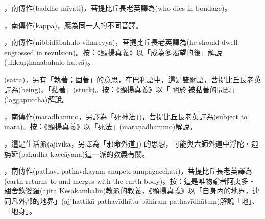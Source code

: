 \startitemgroup[noteitems]
\item{}，南傳作(baddho mīyati)，菩提比丘長老英譯為(who dies in bondage)。
\stopitemgroup

\startitemgroup[noteitems]
\item{}，南傳作(kappa)，應為同一人的不同音譯。
\stopitemgroup

\startitemgroup[noteitems]
\item{}，南傳作(nibbidābahulo vihareyya)，菩提比丘長老英譯為(he should dwell engrossed in revulsion)。按：《顯揚真義》以「成為多渴望的後」解說(ukkaṇṭhanabahulo hutvā)。
\stopitemgroup

\startitemgroup[noteitems]
\item{}(satta)，另有「執著；固著」的意思，在巴利語中，這是雙關語，菩提比丘長老英譯為(being)、「黏著」(stuck)。按：《顯揚真義》以「[關於]被黏著的問題」(laggapucchā)解說。
\stopitemgroup

\startitemgroup[noteitems]
\item{}，南傳作(māradhammo，另譯為「死神法」)，菩提比丘長老英譯為(subject to māra)。按：《顯揚真義》以「死法」(maraṇadhammo)解說。
\stopitemgroup

\startitemgroup[noteitems]
\item{}，這是生活派(ājivika，另譯為「邪命外道」) 的思想，可能與六師外道中浮陀‧迦旃延(pakudha kaccāyana)這一派的教義有關。
\stopitemgroup

\startitemgroup[noteitems]
\item{}，南傳作(pathavī pathavīkāyaṃ anupeti anupagacchati)，菩提比丘長老英譯為(earth returns to and merges with the earth-body)。按：這是唯物論者阿夷多‧翅舍欽婆羅(ajita Kesakambalin)教派的教義，《顯揚真義》以「自身內的地界，連同凡外部的地界」(ajjhattikā pathavīdhātu bāhiraṃ pathavīdhātuṃ)解說「地」、「地身」。
\stopitemgroup

